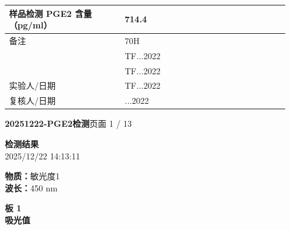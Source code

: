 \documentclass[UTF8,10pt,a4paper,fontset=fandol]{ctexart}
\newcommand{\fieldvalue}[1]{#1}
\newcommand{\handwritten}[1]{#1}
\begin{document}
\begin{tabular}{|p{0.38\linewidth}|p{0.54\linewidth}|}
\hline
样品检测 PGE2 含量（pg/ml） &
\fieldvalue{\handwritten{714.4}}\\
\hline
备注 &
\fieldvalue{\handwritten{70H}}\\[-1mm]
&
\fieldvalue{\handwritten{TF...2022}}\\[-1mm]
&
\fieldvalue{\handwritten{TF...2022}}\\
\hline
实验人/日期 &
\fieldvalue{\handwritten{TF...2022}}\\
\hline
复核人/日期 &
\fieldvalue{\handwritten{...2022}}\\
\hline
\end{tabular}


\newpage

\begin{center}
\textbf{20251222-PGE2检测}\hfill 页面 1 / 13
\end{center}

\textbf{检测结果}\\
2025/12/22 14:13:11

\textbf{物质：}敏光度1\\
\textbf{波长：}450 nm

\textbf{板 1}\\
\textbf{吸光值}
\end{document}
